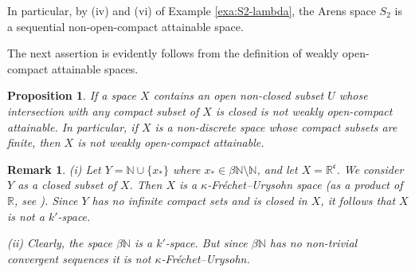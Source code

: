 \documentclass[preprint,11pt]{elsarticle}
\newtheorem{remark}[theorem]{Remark}
\newtheorem{proposition}[theorem]{Proposition}
\newtheorem{example}[theorem]{Example}
\numberwithin{equation}{section}
\numberwithin{theorem}{section}
\newcommand{\NN}{\mathbb{N}}
\newcommand{\IR}{\mathbb{R}}
\newcommand{\SM}{{\setminus}}
\begin{document}
In particular, by (iv) and (vi) of Example \ref{exa:S2-lambda}, the Arens space $S_2$ is a sequential non-open-compact attainable space.



The next assertion is evidently follows from the definition of weakly open-compact attainable spaces.
\begin{proposition} \label{p:non-woca}
If a space $X$ contains an open non-closed subset $U$ whose intersection with any compact subset of $X$ is closed is not weakly open-compact attainable.
In particular, if $X$ is a non-discrete space whose compact subsets are finite, then $X$  is not weakly open-compact attainable.
\end{proposition}





\begin{remark} {\em
(i) Let $Y=\NN\cup\{x_\ast\}$ where $x_\ast\in \beta\NN\SM \NN$, and let $X=\IR^\mathfrak{c}$. We consider $Y$ as a closed subset of $X$. Then $X$ is a $\kappa$-Fr\'{e}chet--Urysohn space (as a product of $\IR$, see \cite{LiL}). Since $Y$ has no infinite compact sets and is closed in $X$, it follows that $X$ is not a $k'$-space.

(ii) Clearly, the space $\beta\NN$ is a $k'$-space. But since $\beta\NN$ has no non-trivial convergent sequences it is not $\kappa$-Fr\'{e}chet--Urysohn.}
\end{remark}
\end{document}
